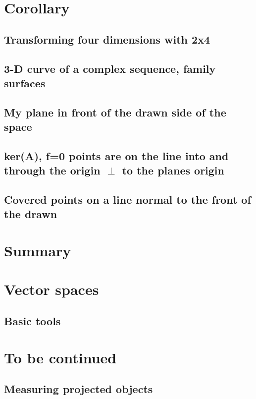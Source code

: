 \documentclass[a4paper]{article}
\begin{document}
\section{Corollary}
\subsection{Transforming four dimensions with 2x4}
\subsection{3-D curve of a complex sequence, family surfaces}
\subsection{My plane in front of the drawn side of the space}
\subsection{ker(A), f=0 points are on the line into and through the origin $\perp$ to the planes origin}
\subsection{Covered points on a line normal to the front of the drawn}

\section{Summary}

\appendix

\section{Vector spaces}
\subsection{Basic tools}

\section{To be continued}
\subsection{Measuring projected objects}
\end{document}
